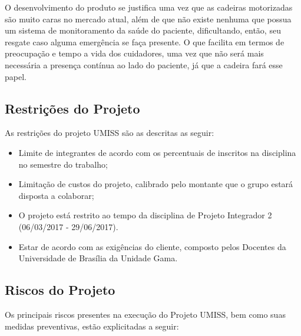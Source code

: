 O desenvolvimento do produto se justifica uma vez que as cadeiras motorizadas 
são muito caras no mercado atual, além de que não existe nenhuma que possua 
um sistema de monitoramento da saúde do paciente, dificultando, então, seu 
resgate caso alguma emergência se faça presente. O que facilita em termos de 
preocupação e tempo a vida dos cuidadores, uma vez que não será mais necessária
a presença contínua ao lado do paciente, já que a cadeira fará esse papel.

\subsection{Restrições do Projeto}
As restrições do projeto UMISS são as descritas as seguir:
\begin{itemize}
    \item Limite de integrantes de acordo com os percentuais de inscritos na disciplina no semestre do trabalho;
    \item Limitação de custos do projeto, calibrado pelo montante que o grupo estará disposta a colaborar;
    \item O projeto está restrito ao tempo da disciplina de Projeto Integrador
   2 (06/03/2017 - 29/06/2017).
    \item Estar de acordo com as exigências do cliente, composto pelos Docentes
    da Universidade de Brasília da Unidade Gama.
\end{itemize}

\subsection{Riscos do Projeto}
Os principais riscos presentes na execução do Projeto UMISS, bem como suas medidas preventivas, estão explicitadas a seguir:

